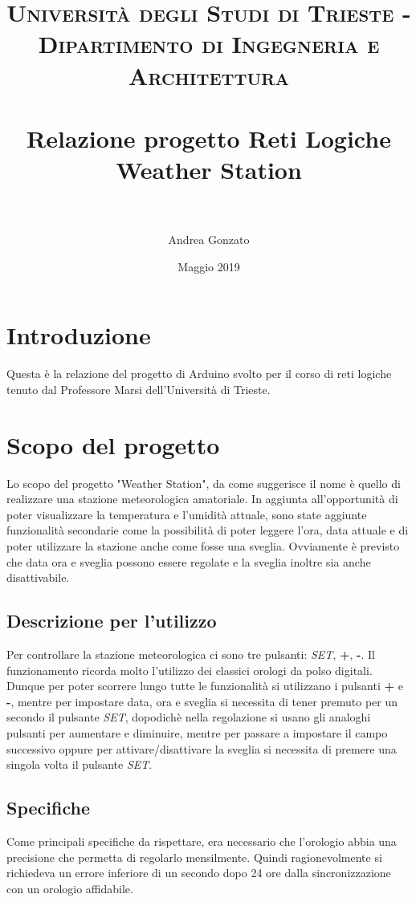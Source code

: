 \documentclass[paper=a4, fontsize=10pt]{scrartcl}
\title{	
\normalfont \normalsize 
\textsc{Universit\`a degli Studi di Trieste - Dipartimento di Ingegneria e Architettura} \\ [25pt] %
\horrule{0.5pt} \\[0.4cm] %
\huge \textbf{Relazione progetto Reti Logiche\\ Weather Station}  \\ %
\horrule{2pt} \\[0.5cm] %
}
\author{Andrea Gonzato} %
\date{\normalsize Maggio 2019} %
\begin{document}
\maketitle %

\pagebreak

\tableofcontents

\pagebreak

\section{Introduzione}
Questa è la relazione del progetto di Arduino svolto per il corso di reti logiche tenuto dal Professore Marsi dell'Università di Trieste.

\section{Scopo del progetto}
Lo scopo del progetto "Weather Station", da come suggerisce il nome è quello di realizzare una stazione meteorologica amatoriale. In aggiunta all'opportunità di poter visualizzare la temperatura e l'umidità attuale, sono state aggiunte funzionalità secondarie come la possibilità di poter leggere l'ora, data attuale e di poter utilizzare la stazione anche come fosse una sveglia. Ovviamente è previsto che data ora e sveglia possono essere regolate e la sveglia inoltre sia anche disattivabile.

\subsection{Descrizione per l'utilizzo}
Per controllare la stazione meteorologica ci sono tre pulsanti: \textit{SET}, \textbf{+}, \textbf{-}.
Il funzionamento ricorda molto l'utilizzo dei classici orologi da polso digitali. Dunque per poter scorrere lungo tutte le funzionalità si utilizzano i pulsanti \textbf{+} e \textbf{-}, mentre per impostare data, ora e sveglia si necessita di tener premuto per un secondo il pulsante \textit{SET}, dopodichè nella regolazione si usano gli analoghi pulsanti per aumentare e diminuire, mentre per passare a impostare il campo successivo oppure per attivare/disattivare la sveglia si necessita di premere una singola volta il pulsante \textit{SET}.


\subsection{Specifiche}
Come principali specifiche da rispettare, era necessario che l'orologio abbia una precisione che permetta di regolarlo mensilmente. Quindi ragionevolmente si richiedeva un errore inferiore di un secondo dopo 24 ore dalla sincronizzazione con un orologio affidabile.
\end{document}
